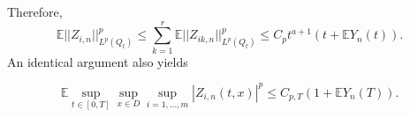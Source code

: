 \documentclass[12pt]{article}
\newtheorem{lemma}{Lemma}
\theoremstyle{definition}
\theoremstyle{remark}
\begin{document}
Therefore,
\begin{equation}\label{eq: Lp norm Z_i}
\mathbb E||Z_{i,n}||^p_{L^p(Q_t)} \leq \sum_{k=1}^r \mathbb E||Z_{ik,n}||^p_{L^p(Q_t)}\leq C_pt^{a+1}(t+\mathbb EY_n(t)).
\end{equation}
An identical argument also yields

\begin{equation}\label{eq: sup norm Z_i}
   \mathbb E \sup_{t\in [0,T]}\sup_{x\in D}\sup_{i=1,...,m}|Z_{i,n}(t,x)|^p \leq C_{p,T}(1+\mathbb EY_n(T)).
\end{equation}

\end{document}

